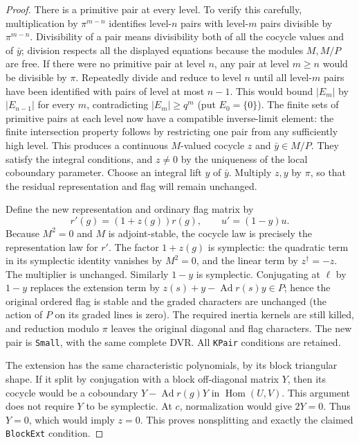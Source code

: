 \begin{proof}
There is a primitive pair at every level. To verify
this carefully, multiplication by $\pi^{m-n}$
identifies level-$n$ pairs with level-$m$ pairs
divisible by $\pi^{m-n}$. Divisibility of a pair
means divisibility both of all the cocycle values
and of $\bar y$; division respects all the displayed
equations because the modules $M,M/P$ are free.
If there were no primitive pair at level $n$, any
pair at level $m\ge n$ would be divisible by $\pi$.
Repeatedly divide and reduce to level $n$ until
all level-$m$ pairs have been identified with
pairs of level at most $n-1$. This would bound
$|E_m|$ by $|E_{n-1}|$ for every $m$, contradicting
$|E_m|\ge q^m$ (put $E_0=\{0\}$). The finite sets
of primitive pairs at each level now have a
compatible inverse-limit element: the finite
intersection property follows by restricting
one pair from any sufficiently high level.
This produces a continuous $M$-valued cocycle
$z$ and $\bar y\in M/P$. They satisfy the integral
conditions, and $z\ne0$ by the uniqueness of
the local coboundary parameter. Choose an integral
lift $y$ of $\bar y$. Multiply $z,y$ by $\pi$,
so that the residual representation and flag will
remain unchanged.

Define the new representation and ordinary flag
matrix by
\[
 r'(g)=(1+z(g))r(g),\qquad u'=(1-y)u .
\]
Because $M^2=0$ and $M$ is adjoint-stable,
the cocycle law is precisely the representation
law for $r'$. The factor $1+z(g)$ is symplectic:
the quadratic term in its symplectic identity
vanishes by $M^2=0$, and the linear term by
$z^\dagger=-z$. The multiplier is unchanged.
Similarly $1-y$ is symplectic. Conjugating at
$\ell$ by $1-y$ replaces the extension term by
$z(s)+y-\operatorname{Ad}r(s)y\in P$; hence the
original ordered flag is stable and the graded
characters are unchanged (the action of $P$ on
its graded lines is zero). The required inertia
kernels are still killed, and reduction modulo
$\pi$ leaves the original diagonal and flag
characters. The new pair is \texttt{Small}, with
the same complete DVR. All \texttt{KPair} conditions
are retained.

The extension has the same characteristic
polynomials, by its block triangular shape.
If it split by conjugation with a block off-diagonal
matrix $Y$, then its cocycle would be a coboundary
$Y-\operatorname{Ad}r(g)Y$ in $\operatorname{Hom}(U,V)$.
This argument does not require $Y$ to be symplectic.
At $c$, normalization would give $2Y=0$.
Thus $Y=0$, which would imply $z=0$.
This proves nonsplitting and exactly the claimed
\texttt{BlockExt} condition.
\end{proof}

